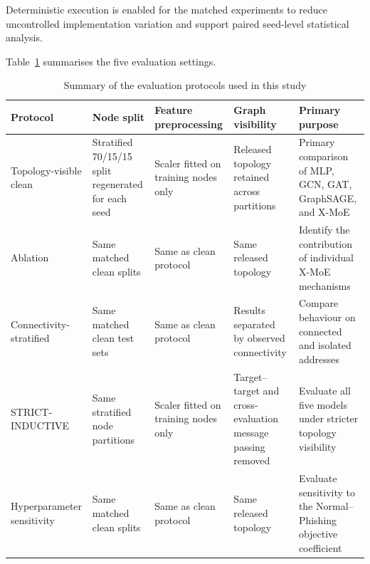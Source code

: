 \documentclass{ieeeaccess}
\begin{document}
Deterministic execution is enabled for the matched experiments to reduce uncontrolled implementation variation and support paired seed-level statistical analysis.

Table~\ref{tab:evaluation_protocols} summarises the five evaluation settings.

\begin{table}[t]
\centering
\caption{Summary of the evaluation protocols used in this study}
\label{tab:evaluation_protocols}

\renewcommand{\arraystretch}{1.12}
\setlength{\tabcolsep}{4pt}
\scriptsize

\begin{tabularx}{\textwidth}{
>{\raggedright\arraybackslash}p{2.7cm}
>{\raggedright\arraybackslash}p{2.9cm}
>{\raggedright\arraybackslash}p{3.0cm}
>{\raggedright\arraybackslash}p{3.2cm}
>{\raggedright\arraybackslash}X
}
\toprule
\textbf{Protocol} &
\textbf{Node split} &
\textbf{Feature preprocessing} &
\textbf{Graph visibility} &
\textbf{Primary purpose} \\
\midrule

Topology-visible clean
&
Stratified 70/15/15 split regenerated for each seed
&
Scaler fitted on training nodes only
&
Released topology retained across partitions
&
Primary comparison of MLP, GCN, GAT, GraphSAGE, and X-MoE
\\[2pt]

Ablation
&
Same matched clean splits
&
Same as clean protocol
&
Same released topology
&
Identify the contribution of individual X-MoE mechanisms
\\[2pt]

Connectivity-stratified
&
Same matched clean test sets
&
Same as clean protocol
&
Results separated by observed connectivity
&
Compare behaviour on connected and isolated addresses
\\[2pt]

STRICT-INDUCTIVE
&
Same stratified node partitions
&
Scaler fitted on training nodes only
&
Target--target and cross-evaluation message passing removed
&
Evaluate all five models under stricter topology visibility
\\[2pt]

Hyperparameter sensitivity
&
Same matched clean splits
&
Same as clean protocol
&
Same released topology
&
Evaluate sensitivity to the Normal--Phishing objective coefficient
\\

\bottomrule
\end{tabularx}
\end{table}
\end{document}
